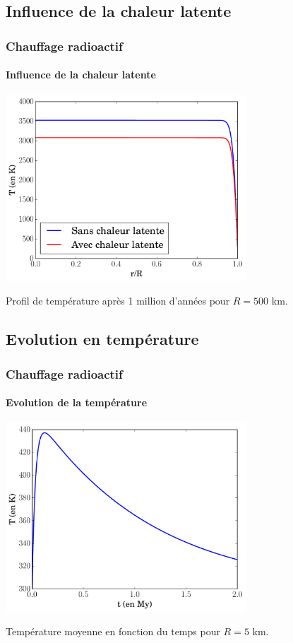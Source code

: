 \documentclass{beamer}
\begin{document}
\subsection{Influence de la chaleur latente}

\begin{frame}
	\frametitle{Chauffage radioactif}
	\framesubtitle{Influence de la chaleur latente}
\vspace{-0.5cm}

\center \includegraphics[width = 9cm]{figures/diffusion1.pdf}
  
Profil de température après 1 million d'années pour $R = 500$ km.
	  	
\end{frame}



\subsection{Evolution en température}

\begin{frame}
	\frametitle{Chauffage radioactif}
	\framesubtitle{Evolution de la température}
\vspace{-0.5cm}

\center \includegraphics[width = 9cm]{figures/tempMoy.pdf}  

Température moyenne en fonction du temps pour $R = 5$ km.
	  	
\end{frame}
\end{document}
